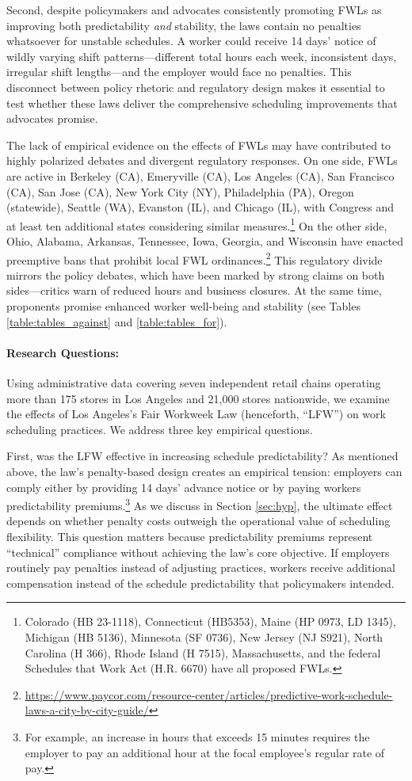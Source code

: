 \documentclass[letterpaper,11pt,leqno]{article}
\theoremstyle{paper}
\begin{document}
Second, despite policymakers and advocates consistently promoting FWLs as improving both predictability \textit{and} stability, the laws contain no penalties whatsoever for unstable schedules. A worker could receive 14 days' notice of wildly varying shift patterns—different total hours each week, inconsistent days, irregular shift lengths—and the employer would face no penalties. This disconnect between policy rhetoric and regulatory design makes it essential to test whether these laws deliver the comprehensive scheduling improvements that advocates promise.

The lack of empirical evidence on the effects of FWLs may have contributed to highly polarized debates and divergent regulatory responses. On one side, FWLs are active in Berkeley (CA), Emeryville (CA), Los Angeles (CA), San Francisco (CA), San Jose (CA), New York City (NY), Philadelphia (PA), Oregon (statewide), Seattle (WA), Evanston (IL), and Chicago (IL), with Congress and at least ten additional states considering similar measures.\footnote{Colorado (HB 23-1118), Connecticut (HB5353), Maine (HP 0973, LD 1345), Michigan (HB 5136), Minnesota (SF 0736), New Jersey (NJ S921), North Carolina (H 366), Rhode Island (H 7515), Massachusetts, and the federal Schedules that Work Act (H.R. 6670) have all proposed FWLs.} On the other side, Ohio, Alabama, Arkansas, Tennessee, Iowa, Georgia, and Wisconsin have enacted preemptive bans that prohibit local FWL ordinances.\footnote{\url{https://www.paycor.com/resource-center/articles/predictive-work-schedule-laws-a-city-by-city-guide/}} This regulatory divide mirrors the policy debates, which have been marked by strong claims on both sides—critics warn of reduced hours and business closures. At the same time, proponents promise enhanced worker well-being and stability (see Tables \ref{table:tables_against} and \ref{table:tables_for}).

\paragraph{Research Questions:}
Using administrative data covering seven independent retail chains operating more than 175 stores in Los Angeles and 21,000 stores nationwide, we examine the effects of Los Angeles's Fair Workweek Law (henceforth, ``LFW'') on work scheduling practices. We address three key empirical questions.  

First, was the LFW effective in increasing schedule predictability? As mentioned above, the law's penalty-based design creates an empirical tension: employers can comply either by providing 14 days' advance notice or by paying workers predictability premiums.\footnote{For example, an increase in hours that exceeds 15 minutes requires the employer to pay an additional hour at the focal employee’s regular rate of pay.} As we discuss in Section \ref{sec:hyp}, the ultimate effect depends on whether penalty costs outweigh the operational value of scheduling flexibility. This question matters because predictability premiums represent ``technical'' compliance without achieving the law's core objective. If employers routinely pay penalties instead of adjusting practices, workers receive additional compensation instead of the schedule predictability that policymakers intended.
\end{document}
